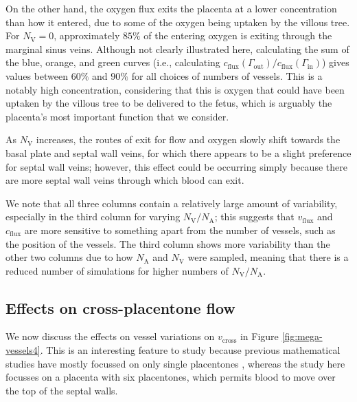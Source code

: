            On the other hand, the oxygen flux exits the placenta at a lower concentration than how it entered, due to some of the oxygen being uptaken by the villous tree. For $N_\text{V} = 0$, approximately $85\%$ of the entering oxygen is exiting through the marginal sinus veins. Although not clearly illustrated here, calculating the sum of the blue, orange, and green curves (i.e., calculating $c_\text{flux}(\Gamma_\text{out})/c_\text{flux}(\Gamma_\text{in})$) gives values between $60\%$ and $90\%$ for all choices of numbers of vessels. This is a notably high concentration, considering that this is oxygen that could have been uptaken by the villous tree to be delivered to the fetus, which is arguably the placenta's most important function that we consider.
            
            As $N_\text{V}$ increases, the routes of exit for flow and oxygen slowly shift towards the basal plate and septal wall veins, for which there appears to be a slight preference for septal wall veins; however, this effect could be occurring simply because there are more septal wall veins through which blood can exit.

            We note that all three columns contain a relatively large amount of variability, especially in the third column for varying $N_\text{V}/N_\text{A}$; this suggests that $v_\text{flux}$ and $c_\text{flux}$ are more sensitive to something apart from the number of vessels, such as the position of the vessels. The third column shows more variability than the other two columns due to how $N_\text{A}$ and $N_\text{V}$ were sampled, meaning that there is a reduced number of simulations for higher numbers of $N_\text{V}/N_\text{A}$.

        \subsection{Effects on cross-placentone flow}
            We now discuss the effects on vessel variations on $v_\text{cross}$ in Figure \ref{fig:mega-vessels4}. This is an interesting feature to study because previous mathematical studies have mostly focussed on only single placentones \cite{lecarpentierComputationalFluidDynamic2016,chernyavskyMathematicalModelIntervillous2010}, whereas the study here focusses on a placenta with six placentones, which permits blood to move over the top of the septal walls.

